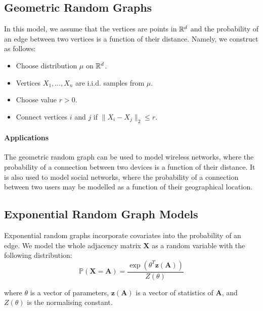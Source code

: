 \documentclass{article}
\begin{document}
\subsection{Geometric Random Graphs}
In this model, we assume that the vertices are points in $\mathbb{R}^d$ and the probability of an edge between two vertices is a function of their distance. Namely, we construct as follows:
\begin{itemize}
    \item Choose distribution $\mu$ on $\mathbb{R}^d$.
    \item Vertices $X_1,\ldots,X_n$ are i.i.d. samples from $\mu$.
    \item Choose value $r>0$.
    \item Connect vertices $i$ and $j$ if $\|X_i-X_j\|_2\leq r$.
\end{itemize}

\paragraph{Applications}
    The geometric random graph can be used to model wireless networks, where the probability of a connection between two devices is a function of their distance. It is also used to model social networks, where the probability of a connection between two users may be modelled as a function of their geographical location.


\subsection{Exponential Random Graph Models}
Exponential random graphs incorporate covariates into the probability of an edge. We model the whole adjacency matrix $\mathbf{X}$ as a random variable with the following distribution:
\begin{equation*}
    \mathbb{P}(\mathbf{X}=\mathbf{A}) = \frac{\exp(\theta^T \mathbf{z}(\mathbf{A}))}{Z(\theta)}
\end{equation*}

where $\theta$ is a vector of parameters, $\mathbf{z}(\mathbf{A})$ is a vector of statistics of $\mathbf{A}$, and $Z(\theta)$ is the normalising constant. 


\newpage


\end{document}
